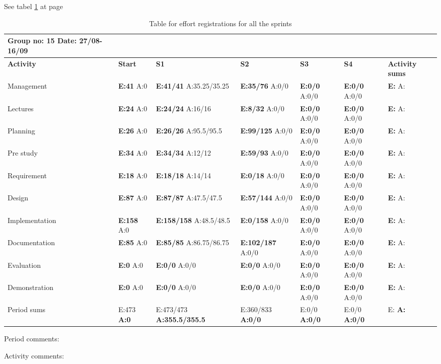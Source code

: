See tabel \ref{tab:effortsprints} at page \pageref{tab:effortsprints}
\begin{table}
\begin{tabularx}{\linewidth}{>{\setlength\hsize{.55\hsize}}X|>{\setlength\hsize{0.2\hsize}}X|>{\setlength\hsize{0.4\hsize}}X|>{\setlength\hsize{0.3\hsize}}X|>{\setlength\hsize{0.3\hsize}}X|>{\setlength\hsize{.3\hsize}}X|>{\setlength\hsize{.2\hsize}}X}
Group no: 15 Date: 27/08-16/09 \\ \hline
\textbf{Activity} & \textbf{Start} & \textbf{S1} & \textbf{S2} & \textbf{S3} & \textbf{S4} & \textbf{Activity sums}\\ \hline \hline
Management & \textbf{E:41} A:0 & \textbf{E:41/41} A:35.25/35.25 & \textbf{E:35/76} A:0/0 & \textbf{E:0/0} A:0/0 & \textbf{E:0/0} A:0/0 & \textbf{E: } A:  \\ \hline
Lectures & \textbf{E:24} A:0 & \textbf{E:24/24} A:16/16 & \textbf{E:8/32} A:0/0 & \textbf{E:0/0} A:0/0 & \textbf{E:0/0} A:0/0 & \textbf{E: } A:  \\ \hline
Planning & \textbf{E:26} A:0 & \textbf{E:26/26} A:95.5/95.5 & \textbf{E:99/125} A:0/0 & \textbf{E:0/0} A:0/0 & \textbf{E:0/0} A:0/0  & \textbf{E: } A:  \\ \hline
Pre study & \textbf{E:34} A:0 & \textbf{E:34/34} A:12/12 & \textbf{E:59/93} A:0/0 & \textbf{E:0/0} A:0/0 & \textbf{E:0/0} A:0/0 & \textbf{E: } A:  \\ \hline
Requirement & \textbf{E:18} A:0 & \textbf{E:18/18} A:14/14 & \textbf{E:0/18} A:0/0 & \textbf{E:0/0} A:0/0 & \textbf{E:0/0} A:0/0 & \textbf{E: } A:  \\ \hline
Design & \textbf{E:87} A:0 & \textbf{E:87/87} A:47.5/47.5 & \textbf{E:57/144} A:0/0 & \textbf{E:0/0} A:0/0 & \textbf{E:0/0} A:0/0 & \textbf{E: } A:  \\ \hline
Implementation & \textbf{E:158} A:0 & \textbf{E:158/158} A:48.5/48.5 & \textbf{E:0/158} A:0/0 & \textbf{E:0/0} A:0/0 & \textbf{E:0/0} A:0/0 & \textbf{E: } A:  \\ \hline
Documentation & \textbf{E:85} A:0 & \textbf{E:85/85} A:86.75/86.75 & \textbf{E:102/187} A:0/0 & \textbf{E:0/0} A:0/0 & \textbf{E:0/0} A:0/0 & \textbf{E: } A:  \\ \hline
Evaluation & \textbf{E:0} A:0 & \textbf{E:0/0} A:0/0 & \textbf{E:0/0} A:0/0 & \textbf{E:0/0} A:0/0 & \textbf{E:0/0} A:0/0 & \textbf{E: } A:  \\ \hline
Demonstration & \textbf{E:0} A:0 & \textbf{E:0/0} A:0/0 & \textbf{E:0/0} A:0/0 & \textbf{E:0/0} A:0/0 & \textbf{E:0/0} A:0/0 & \textbf{E: } A:  \\ \hline
Period sums & E:473 \textbf{A:0} & E:473/473 \textbf{A:355.5/355.5} & E:360/833 \textbf{A:0/0} & E:0/0 \textbf{A:0/0} & E:0/0 \textbf{A:0/0} & E: \textbf{A:}  
\end{tabularx}

Period comments:

Activity comments:
\caption{Table for effort registrations for all the sprints} \label{tab:effortsprints}
\end{table}


